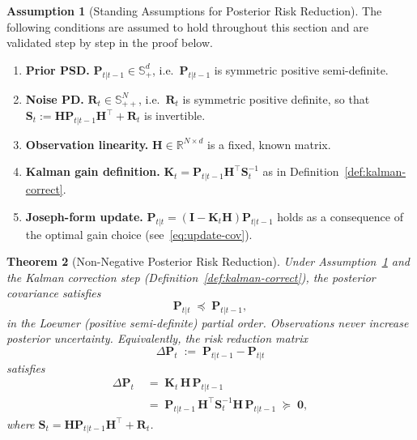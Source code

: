\documentclass[12pt,openany]{book}
\numberwithin{equation}{chapter}
\theoremstyle{plain}
\newtheorem{theorem}{Theorem}[chapter]
\theoremstyle{definition}
\newtheorem{assumption}[theorem]{Assumption}
\theoremstyle{remark}
\begin{document}
\begin{assumption}[Standing Assumptions for Posterior Risk Reduction]
\label{ass:risk-reduction}
The following conditions are assumed to hold throughout this section
and are validated step by step in the proof below.
\begin{enumerate}
  \item \textbf{Prior PSD.}
        $\mathbf{P}_{t|t-1} \in \mathbb{S}^{d}_{+}$, i.e.\
        $\mathbf{P}_{t|t-1}$ is symmetric positive semi-definite.
  \item \textbf{Noise PD.}
        $\mathbf{R}_t \in \mathbb{S}^{N}_{++}$, i.e.\
        $\mathbf{R}_t$ is symmetric positive definite, so that
        $\mathbf{S}_t := \mathbf{H}\mathbf{P}_{t|t-1}\mathbf{H}^\top
        + \mathbf{R}_t$ is invertible.
  \item \textbf{Observation linearity.}
        $\mathbf{H} \in \mathbb{R}^{N \times d}$ is a fixed,
        known matrix.
  \item \textbf{Kalman gain definition.}
        $\mathbf{K}_t =
        \mathbf{P}_{t|t-1}\mathbf{H}^\top\mathbf{S}_t^{-1}$
        as in Definition~\ref{def:kalman-correct}.
  \item \textbf{Joseph-form update.}
        $\mathbf{P}_{t|t} =
        (\mathbf{I} - \mathbf{K}_t\mathbf{H})\mathbf{P}_{t|t-1}$
        holds as a consequence of the optimal gain choice
        (see~\eqref{eq:update-cov}).
\end{enumerate}
\end{assumption}

\begin{theorem}[Non-Negative Posterior Risk Reduction]
\label{thm:risk-reduction}
Under Assumption~\ref{ass:risk-reduction} and the Kalman correction
step (Definition~\ref{def:kalman-correct}), the posterior covariance
satisfies
\begin{equation}
  \mathbf{P}_{t|t} \;\preceq\; \mathbf{P}_{t|t-1},
  \label{eq:risk-reduction}
\end{equation}
in the Loewner (positive semi-definite) partial order.
Observations never increase posterior uncertainty.
Equivalently, the \emph{risk reduction matrix}
\begin{equation}
  \Delta\mathbf{P}_t
  \;:=\; \mathbf{P}_{t|t-1} - \mathbf{P}_{t|t}
  \label{eq:risk-reduction-def}
\end{equation}
satisfies
\begin{align}
  \Delta\mathbf{P}_t
  &\;=\; \mathbf{K}_t\,\mathbf{H}\,\mathbf{P}_{t|t-1}
  \label{eq:risk-reduction-formula} \\
  &\;=\; \mathbf{P}_{t|t-1}\,\mathbf{H}^\top
         \mathbf{S}_t^{-1}
         \mathbf{H}\,\mathbf{P}_{t|t-1}
  \;\succeq\; \mathbf{0},
  \label{eq:risk-reduction-gram}
\end{align}
where $\mathbf{S}_t = \mathbf{H}\mathbf{P}_{t|t-1}\mathbf{H}^\top
+ \mathbf{R}_t$.
\end{theorem}
\end{document}
